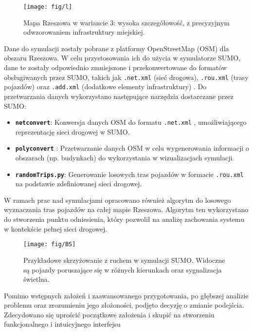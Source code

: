 \documentclass[12pt, a4paper]{article} %
\begin{document}
    \begin{figure}[!h]
        \centering
        \texttt{[image: fig/l]}
        \caption
        {Mapa Rzeszowa w wariancie 3: wysoka szczegółowość, z precyzyjnym odwzorowaniem infrastruktury miejskiej.}
        \label{fig:mapa_wariant3}
    \end{figure}

    Dane do symulacji zostały pobrane z platformy OpenStreetMap (OSM) dla obszaru Rzeszowa. W celu przystosowania ich do
    użycia w symulatorze SUMO, dane te zostały odpowiednio zmniejszone i przekonwertowane do formatów obsługiwanych
    przez SUMO, takich jak \texttt{.net.xml} (sieć drogowa), \texttt{.rou.xml} (trasy pojazdów) oraz
    \texttt{.add.xml} (dodatkowe elementy infrastruktury)
    . Do przetwarzania danych wykorzystano następujące narzędzia dostarczane przez SUMO:

    \begin{itemize}
        \item \textbf{\texttt{netconvert}}: Konwersja danych OSM do formatu \texttt{.net.xml}
        , umożliwiającego reprezentację sieci drogowej w SUMO.
        \item \textbf{\texttt{polyconvert}}
        : Przetwarzanie danych OSM w celu wygenerowania informacji o obszarach (np. budynkach) do wykorzystania w
        wizualizacjach symulacji.
        \item \textbf{\texttt{randomTrips.py}}: Generowanie losowych tras pojazdów w formacie \texttt{.rou.xml}
        na podstawie zdefiniowanej sieci drogowej.
    \end{itemize}

    W ramach prac nad symulacjami opracowano również algorytm do losowego wyznaczania tras pojazdów na całej mapie
    Rzeszowa. Algorytm ten wykorzystano do stworzenia punktu odniesienia, który pozwolił na analizę zachowania systemu w
    kontekście pełnej sieci drogowej.

    \begin{figure}[!h]
        \centering
        \texttt{[image: fig/BS]}
        \caption
        {Przykładowe skrzyżowanie z ruchem w symulacji SUMO. Widoczne są pojazdy poruszające się w różnych kierunkach
        oraz sygnalizacja świetlna.}
        \label{fig:skrzyzowanie_ruch}
    \end{figure}

    Pomimo wstępnych założeń i zaawansowanego przygotowania, po głębszej analizie problemu oraz zrozumieniu jego
    złożoności, podjęto decyzję o zmianie podejścia. Zdecydowano się uprościć początkowe założenia i skupić na
    stworzeniu funkcjonalnego i intuicyjnego interfejsu
\end{document}
